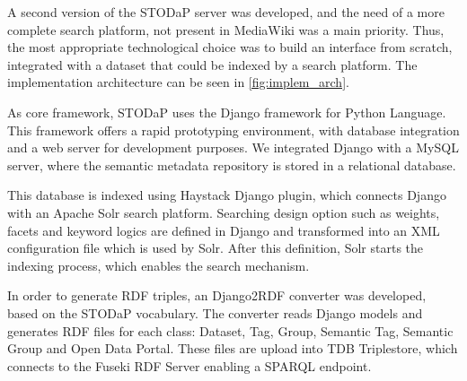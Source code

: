 A second version of the STODaP server was developed, and the need of a more complete search platform, not present in MediaWiki was a main priority.
Thus, the most appropriate technological choice was to build an interface from scratch, integrated with a dataset that could be indexed by a search platform.
The implementation architecture can be seen in \autoref{fig:implem_arch}.

As core framework, STODaP uses the Django framework for Python Language.
This framework offers a rapid prototyping environment, with database integration and a web server for development purposes.
We integrated Django with a MySQL server, where the semantic metadata repository is stored in a relational database.

This database is indexed using Haystack Django plugin, which connects Django with an Apache Solr search platform.
Searching design option such as weights, facets and keyword logics are defined in Django and transformed into an XML configuration file which is used by Solr.
After this definition, Solr starts the indexing process, which enables the search mechanism.

In order to generate RDF triples, an Django2RDF converter was developed, based on the STODaP vocabulary.
The converter reads Django models and generates RDF files for each class: Dataset, Tag, Group, Semantic Tag, Semantic Group and Open Data Portal.
These files are upload into TDB Triplestore, which connects to the Fuseki RDF Server enabling a SPARQL endpoint.



